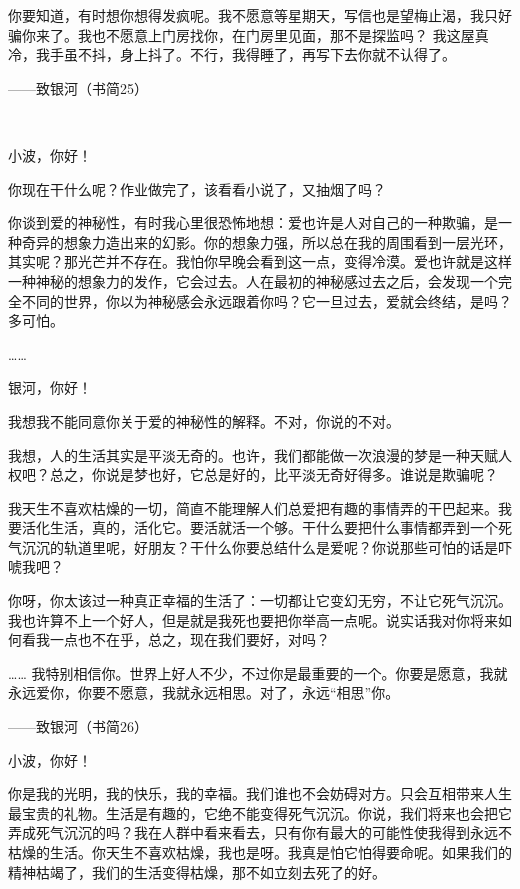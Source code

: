 你要知道，有时想你想得发疯呢。我不愿意等星期天，写信也是望梅止渴，我只好骗你来了。我也不愿意上门房找你，在门房里见面，那不是探监吗？ 我这屋真冷，我手虽不抖，身上抖了。不行，我得睡了，再写下去你就不认得了。 





——致银河（书简25） 

　 

小波，你好！　 

你现在干什么呢？作业做完了，该看看小说了，又抽烟了吗？ 

你谈到爱的神秘性，有时我心里很恐怖地想：爱也许是人对自己的一种欺骗，是一种奇异的想象力造出来的幻影。你的想象力强，所以总在我的周围看到一层光环，其实呢？那光芒并不存在。我怕你早晚会看到这一点，变得冷漠。爱也许就是这样一种神秘的想象力的发作，它会过去。人在最初的神秘感过去之后，会发现一个完全不同的世界，你以为神秘感会永远跟着你吗？它一旦过去，爱就会终结，是吗？多可怕。 

…… 

银河，你好！ 

我想我不能同意你关于爱的神秘性的解释。不对，你说的不对。 

我想，人的生活其实是平淡无奇的。也许，我们都能做一次浪漫的梦是一种天赋人权吧？总之，你说是梦也好，它总是好的，比平淡无奇好得多。谁说是欺骗呢？ 

我天生不喜欢枯燥的一切，简直不能理解人们总爱把有趣的事情弄的干巴起来。我要活化生活，真的，活化它。要活就活一个够。干什么要把什么事情都弄到一个死气沉沉的轨道里呢，好朋友？干什么你要总结什么是爱呢？你说那些可怕的话是吓唬我吧？ 

你呀，你太该过一种真正幸福的生活了：一切都让它变幻无穷，不让它死气沉沉。我也许算不上一个好人，但是就是我死也要把你举高一点呢。说实话我对你将来如何看我一点也不在乎，总之，现在我们要好，对吗？ 

…… 我特别相信你。世界上好人不少，不过你是最重要的一个。你要是愿意，我就永远爱你，你要不愿意，我就永远相思。对了，永远“相思”你。 





——致银河（书简26） 

小波，你好！ 

你是我的光明，我的快乐，我的幸福。我们谁也不会妨碍对方。只会互相带来人生最宝贵的礼物。生活是有趣的，它绝不能变得死气沉沉。你说，我们将来也会把它弄成死气沉沉的吗？我在人群中看来看去，只有你有最大的可能性使我得到永远不枯燥的生活。你天生不喜欢枯燥，我也是呀。我真是怕它怕得要命呢。如果我们的精神枯竭了，我们的生活变得枯燥，那不如立刻去死了的好。 

